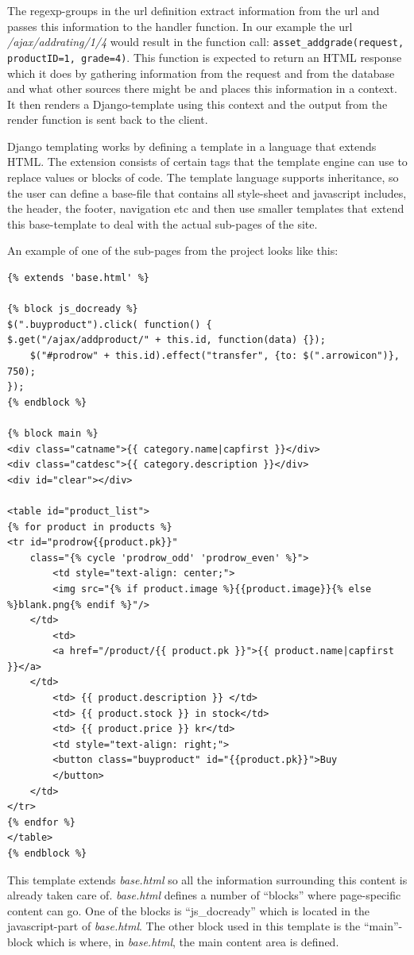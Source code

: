 \documentclass[12pt, a4paper,titlepage]{article}
\begin{document}
The regexp-groups in the url definition extract information from the url
and passes this information to the handler function. In our example the url
\emph{/ajax/addrating/1/4} would result in the function call:
\lstinline{asset_addgrade(request, productID=1, grade=4)}.
This function is expected to return an HTML response which it does
by gathering information from the request and from the database and what
other sources there might be and places this information in a context. 
It then renders a Django-template using this context and the output from the
render function is sent back to the client.

Django templating works by defining a template in a language that extends
HTML. The extension consists of certain tags that the template engine can
use to replace values or blocks of code. The template language supports
inheritance, so the user can define a base-file that contains all style-sheet and
javascript includes, the header, the footer, navigation etc and then use smaller
templates that extend this base-template to deal with the actual sub-pages of
the site.

An example of one of the sub-pages from the project looks like this:
\lstset{language=HTML}
\begin{lstlisting}
{% extends 'base.html' %}

{% block js_docready %}
$(".buyproduct").click( function() {
$.get("/ajax/addproduct/" + this.id, function(data) {}); 
    $("#prodrow" + this.id).effect("transfer", {to: $(".arrowicon")}, 750);
});
{% endblock %}
 
{% block main %}
<div class="catname">{{ category.name|capfirst }}</div>
<div class="catdesc">{{ category.description }}</div>
<div id="clear"></div>

<table id="product_list">
{% for product in products %}
<tr id="prodrow{{product.pk}}" 
    class="{% cycle 'prodrow_odd' 'prodrow_even' %}">
        <td style="text-align: center;">
		<img src="{% if product.image %}{{product.image}}{% else %}blank.png{% endif %}"/>
	</td>
        <td>
		<a href="/product/{{ product.pk }}">{{ product.name|capfirst }}</a>
	</td>
        <td> {{ product.description }} </td>
        <td> {{ product.stock }} in stock</td>
        <td> {{ product.price }} kr</td>
        <td style="text-align: right;">
		<button class="buyproduct" id="{{product.pk}}">Buy
		</button>
	</td>
</tr>
{% endfor %}
</table>
{% endblock %}
\end{lstlisting}
\lstset{language=Python}
This template extends \emph{base.html} so all the information surrounding
this content is already taken care of. \emph{base.html} defines a number of
``blocks'' where page-specific content can go. One of the blocks is
``js\_docready'' which is located in the javascript-part of \emph{base.html}.
The other block used in this template is the ``main''-block which is where, 
in \emph{base.html}, the main content area is defined.
\end{document}
